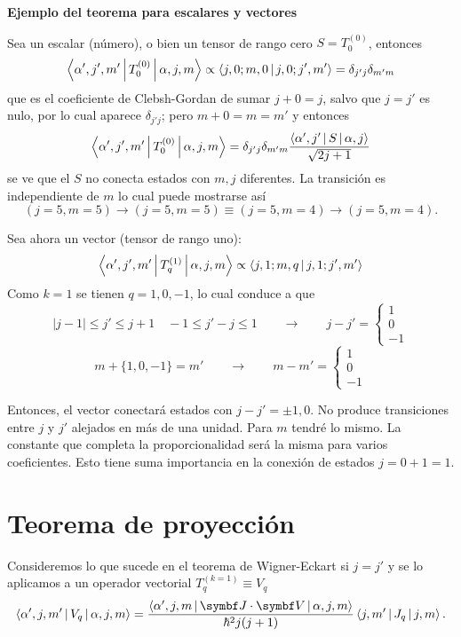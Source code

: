 \documentclass[10pt,oneside]{CBFT_book}
\begin{document}
\begin{ejemplo}{\bf Ejemplo del teorema para escalares y vectores}

Sea un escalar (número), o bien un tensor de rango cero $S=T_0^{(0)}$, entonces
\[
	\Braket{\alpha', j', m' |T_0^{(0)}| \alpha, j, m} \propto 
	\Braket{j, 0 ; m, 0 |j, 0 ; j', m'} = \delta_{j'j}\delta_{m'm} 
\]
que es el coeficiente de Clebsh-Gordan de sumar $j+0=j$, salvo que $j=j'$ es nulo,
por lo cual aparece $\delta_{j'j}$; pero $m+0 = m = m'$ y entonces
\[
	\Braket{\alpha', j', m' |T_0^{(0)}| \alpha, j, m} =
	\delta_{j'j}\delta_{m'm}  \frac{\Braket{\alpha',j'|S|\alpha,j}}{\sqrt{2j+1}}
\]
se ve que el $S$ no conecta estados con $m,j$ diferentes. La transición es independiente de
$m$ lo cual puede mostrarse así
\[
	(j=5,m=5) \to (j=5,m=5) \equiv (j=5,m=4) \to (j=5,m=4).
\]

Sea ahora un vector (tensor de rango uno):
\[
	\Braket{\alpha', j', m'|T_q^{(1)}| \alpha, j, m} 
	\propto \Braket{j, 1 ; m , q | j, 1 ; j', m'}
\]
Como $k=1$ se tienen $q=1,0,-1$, lo cual conduce a que
\[
	|j-1| \leq j' \leq j+1 \quad -1\leq j'-j \leq 1 
	\qquad \rightarrow  \qquad 
	j-j'=\begin{cases} 1 \\ 0 \\ -1 \end{cases}
\]
\[
	m + \{1,0,-1\} = m' \qquad \rightarrow \qquad 
	m - m' =\begin{cases} 1 \\ 0 \\ -1 \end{cases}
\]

Entonces, el vector conectará estados con $j-j' = \pm 1, 0$. No produce transiciones entre
$j$ y $j'$ alejados en más de una unidad. Para $m$ tendré lo mismo.
La constante que completa la proporcionalidad será la misma para varios coeficientes.
Esto tiene suma importancia en la conexión de estados $j=0+1=1$.

\end{ejemplo}

\section{Teorema de proyección}

Consideremos lo que sucede en el teorema de Wigner-Eckart si $j=j'$ y se lo aplicamos a un operador vectorial 
$T_q^{(k=1)} \equiv V_q$
\[
	\Braket{\alpha', j, m'|V_q|\alpha, j, m} = 
	\frac{\Braket{\alpha', j, m|\vb{J}\cdot\vb{V}|\alpha, j, m}}{\hbar^2j(j+1)}\Braket{j, m'|J_q|j, m}.
\]
\end{document}
